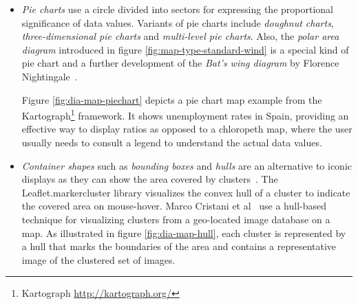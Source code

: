\begin{itemize}
\begin{itemize}
{    
    \label{fig:dia-map-barchart}
}


\item \textit{Pie charts} use a circle divided into sectors for expressing the proportional significance of data values. Variants of pie charts include \textit{doughnut charts}, \textit{three-dimensional pie charts} and \textit{multi-level pie charts}. Also, the \textit{polar area diagram} introduced in figure \ref{fig:map-type-standard-wind} is a special kind of pie chart and a further development of the \textit{Bat's wing diagram} by Florence Nightingale~\cite{night98bart}.

Figure \ref{fig:dia-map-piechart} depicts a pie chart map example from the Kartograph\footnote{Kartograph \url{http://kartograph.org/}} framework. It shows unemployment rates in Spain, providing an effective way to display ratios as opposed to a chloropeth map, where the user usually needs to consult a legend to understand the actual data values.

\item \textit{Container shapes} such as \textit{bounding boxes} and \textit{hulls} are an alternative to iconic displays as they can show the area covered by clusters~\cite{Delort10vis}. The Leaflet.markercluster library visualizes the convex hull of a cluster to indicate the covered area on mouse-hover. Marco Cristani et al~\cite{Cristani08geoimagemaps} use a hull-based technique for visualizing clusters from a geo-located image database on a map. As illustrated in figure \ref{fig:dia-map-hull}, each cluster is represented by a hull that marks the boundaries of the area and contains a representative image of the clustered set of images.



\end{itemize}
\end{itemize}

